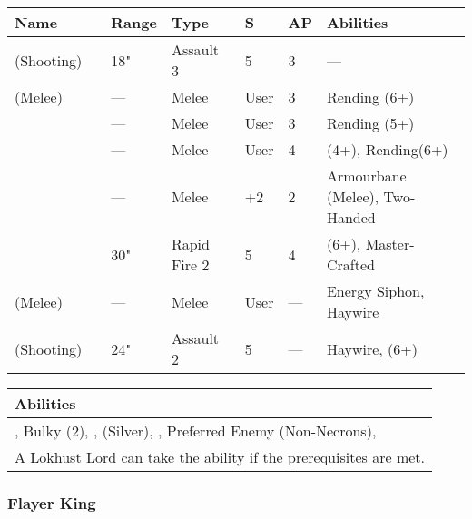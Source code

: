 \noindent
\begin{tabular}{||m{110pt} m{30pt} m{31pt} m{55pt} m{12pt} m{12pt} m{210pt}||}
	\hline
	Name & & Range & Type & S & AP & Abilities \\
	\hline
	\quickref{Staff of Light} (Shooting) & & 18" & Assault 3 & 5 & 3 & — \\
	\quickref{Staff of Light} (Melee) & & — & Melee & User & 3 & Rending (6+) \\
	\quickref{Hyperphase Sword} &  & — & Melee & User & 3 & Rending (5+) \\
	\quickref{Voidblade} &  & — & Melee & User & 4 & \quickref{Entropic Strike} (4+), Rending(6+) \\
	\quickref{Warscythe} &  & — & Melee & +2 & 2 & Armourbane (Melee), Two-Handed \\
	\quickref{Relic Gauss Blaster} & & 30" & Rapid Fire 2 & 5 & 4 & \quickref{Gauss} (6+), Master-Crafted \\
	\quickref{Rod of Night} (Melee) & & — & Melee & User & — & Energy Siphon, Haywire \\
	\quickref{Rod of Night} (Shooting) & & 24" & Assault 2 & 5 & — & Haywire, \quickref{Tesla} (6+) \\
	\hline
\end{tabular}

\noindent
\begin{tabular}{||m{532pt}||}
	\hline
	Abilities \\
	\hline
	\quickref{Annihilation Protocols}, Bulky (2), \quickref{Command Protocols}, \quickref{Nodal Command}(Silver), \quickref{Living Metal}, Preferred Enemy (Non-Necrons), \quickref{Reanimation Protocols} \\
	A Lokhust Lord can take the \quickref{Decurion Nemesor} ability if the prerequisites are met. \\
	\hline
\end{tabular}

\newpage
\subsubsection{Flayer King}

